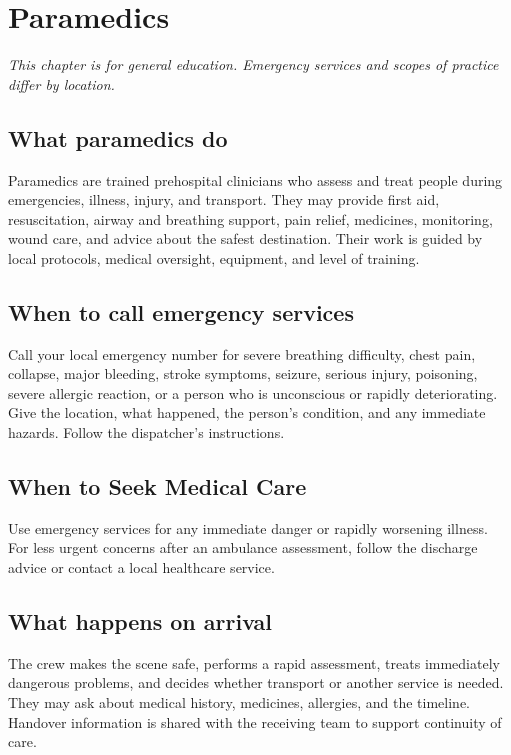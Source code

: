\chapter{Paramedics}

\medskip
\noindent\textit{This chapter is for general education. Emergency services and scopes of practice differ by location.}

\section*{What paramedics do}
Paramedics are trained prehospital clinicians who assess and treat people during emergencies, illness, injury, and transport. They may provide first aid, resuscitation, airway and breathing support, pain relief, medicines, monitoring, wound care, and advice about the safest destination. Their work is guided by local protocols, medical oversight, equipment, and level of training.

\section*{When to call emergency services}
Call your local emergency number for severe breathing difficulty, chest pain, collapse, major bleeding, stroke symptoms, seizure, serious injury, poisoning, severe allergic reaction, or a person who is unconscious or rapidly deteriorating. Give the location, what happened, the person’s condition, and any immediate hazards. Follow the dispatcher’s instructions.

\section*{When to Seek Medical Care}
Use emergency services for any immediate danger or rapidly worsening illness. For less urgent concerns after an ambulance assessment, follow the discharge advice or contact a local healthcare service.

\section*{What happens on arrival}
The crew makes the scene safe, performs a rapid assessment, treats immediately dangerous problems, and decides whether transport or another service is needed. They may ask about medical history, medicines, allergies, and the timeline. Handover information is shared with the receiving team to support continuity of care.

